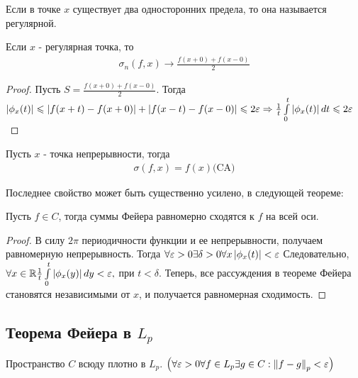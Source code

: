 \begin{definition}
	Если в точке $x$ существует два односторонних предела, то она называется регулярной.
\end{definition}

\begin{corollary}
	Если $x$ - регулярная точка, то 
	\begin{gather*}
		\sigma_n(f, x) \rightarrow \frac{f(x + 0) + f(x - 0)}{2}
	\end{gather*}
\end{corollary}

\begin{proof}
	Пусть $S = \frac{f(x + 0) + f(x - 0)}{2}$. Тогда $\left|\phi_x(t)\right| \leqslant 
	\left|f(x + t) - f(x + 0)\right| + \left|f(x - t) - f(x - 0)\right| \leqslant 2\varepsilon \\
	\Rightarrow \frac{1}{t}\int\limits_{0}^{t} \left|\phi_x(t)\right| dt \leqslant 2\varepsilon$
\end{proof}

\begin{corollary}
	Пусть $x$ - точка непрерывности, тогда 
	\begin{gather*}
		\sigma(f, x) = f(x) \text{(CA)}
	\end{gather*}
\end{corollary}

Последнее свойство может быть существенно усилено, в следующей теореме:

\begin{theorem}
	Пусть $f \in C$, тогда суммы Фейера равномерно сходятся к $f$ на всей оси.	
\end{theorem}

\begin{proof}
	В силу $2\pi$ периодичности функции и ее непрерывности, 
	получаем равномерную непрерывность. Тогда
	$\forall\varepsilon > 0 \exists \delta > 0 \forall x \left|\phi_x(t)\right| < \varepsilon$
	Следовательно, $\forall x \in \mathbb{R} \frac{1}{t}\int\limits_{0}^{t} \left|\phi_x(y)\right|dy < \varepsilon, 
	$ при $ t < \delta$.
	Теперь, все рассуждения в теореме Фейера становятся независимыми от 
	$x$, и получается равномерная сходимость.
	
\end{proof}

\subsection{Теорема Фейера в $L_p$}

\begin{statement}
	Пространство $C$ всюду плотно в $L_p$.
	$\left( \forall\varepsilon > 0 \forall f \in L_p \exists g \in C : \left\|f - g\right\|_p < \varepsilon \right)$
\end{statement}


